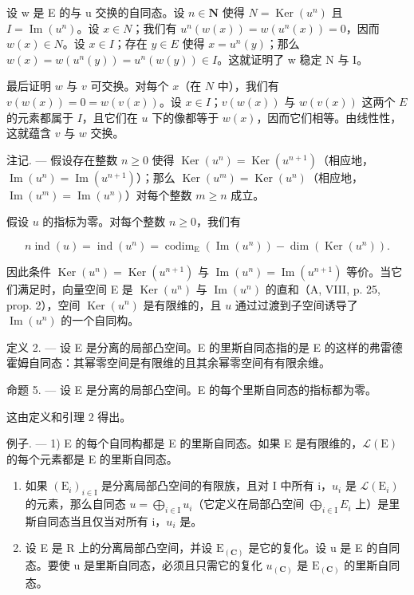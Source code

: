 设 w 是 E 的与 u 交换的自同态。设 \(n \in \mathbf{N}\) 使得 \(N = \operatorname{Ker}(u^{n})\) 且 \(I = \operatorname{Im}(u^{n})\)。设 \(x \in N\)；我们有 \(u^{n}(w(x)) = w(u^{n}(x)) = 0\)，因而 \(w(x) \in N\)。设 \(x \in I\)；存在 \(y \in E\) 使得 \(x = u^{n}(y)\)；那么 \(w(x) = w(u^{n}(y)) = u^{n}(w(y)) \in I\)。这就证明了 w 稳定 N 与 I。

最后证明 \(w\) 与 \(v\) 可交换。对每个 \(x\)（在 \(N\) 中），我们有 \(v(w(x)) = 0 = w(v(x))\)。设 \(x \in I\)；\(v(w(x))\) 与 \(w(v(x))\) 这两个 \(E\) 的元素都属于 \(I\)，且它们在 \(u\) 下的像都等于 \(w(x)\)，因而它们相等。由线性性，这就蕴含 \(v\) 与 \(w\) 交换。

注记. --- 假设存在整数 \(n \geqslant 0\) 使得 \(\operatorname{Ker}(u^{n}) = \operatorname{Ker}(u^{n+1})\)（相应地，\(\operatorname{Im}(u^{n}) = \operatorname{Im}(u^{n+1})\)）；那么 \(\operatorname{Ker}(u^{m}) = \operatorname{Ker}(u^{n})\)（相应地，\(\operatorname{Im}(u^{m}) = \operatorname{Im}(u^{n})\)）对每个整数 \(m \geqslant n\) 成立。

假设 \(u\) 的指标为零。对每个整数 \(n \geqslant 0\)，我们有

\[
n \operatorname{ind} (u) = \operatorname{ind} \left(u ^ {n}\right) = \operatorname{codim} _ {\mathrm{E}} \left(\operatorname{Im} \left(u ^ {n}\right)\right) - \dim \left(\operatorname{Ker} \left(u ^ {n}\right)\right).
\]

因此条件 \(\operatorname{Ker}(u^n) = \operatorname{Ker}(u^{n+1})\) 与 \(\operatorname{Im}(u^n) = \operatorname{Im}(u^{n+1})\) 等价。当它们满足时，向量空间 E 是 \(\operatorname{Ker}(u^n)\) 与 \(\operatorname{Im}(u^n)\) 的直和（A, VIII, p. 25, prop. 2），空间 \(\operatorname{Ker}(u^n)\) 是有限维的，且 \(u\) 通过过渡到子空间诱导了 \(\operatorname{Im}(u^n)\) 的一个自同构。

定义 2. --- 设 E 是分离的局部凸空间。E 的里斯自同态指的是 E 的这样的弗雷德霍姆自同态：其幂零空间是有限维的且其余幂零空间有有限余维。

命题 5. --- 设 E 是分离的局部凸空间。E 的每个里斯自同态的指标都为零。

这由定义和引理 2 得出。

例子. --- 1) E 的每个自同构都是 E 的里斯自同态。如果 E 是有限维的，\(\mathcal{L}(\mathrm{E})\) 的每个元素都是 E 的里斯自同态。

\begin{enumerate}
\def\labelenumi{\arabic{enumi})}
\setcounter{enumi}{1}
\item
   如果 \((\mathrm{E}_{i})_{i\in\mathrm{I}}\) 是分离局部凸空间的有限族，且对 I 中所有 i，\(u_{i}\) 是 \(\mathcal{L}(\mathrm{E}_{i})\) 的元素，那么自同态 \(u=\bigoplus_{i\in\mathrm{I}}u_{i}\)（它定义在局部凸空间 \(\bigoplus_{i\in\mathrm{I}}E_{i}\) 上）是里斯自同态当且仅当对所有 i，\(u_{i}\) 是。
\item
   设 E 是 R 上的分离局部凸空间，并设 \(\mathrm{E}_{(\mathbf{C})}\) 是它的复化。设 u 是 E 的自同态。要使 u 是里斯自同态，必须且只需它的复化 \(u_{(\mathbf{C})}\) 是 \(\mathrm{E}_{(\mathbf{C})}\) 的里斯自同态。
\end{enumerate}

